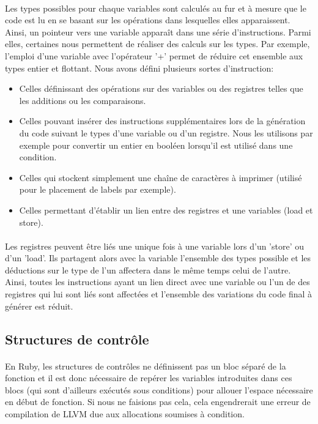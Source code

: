 \documentclass[12pt]{article}
\begin{document}
\paragraph{} Les types possibles pour chaque variables sont calculés au fur et à mesure que
le code est lu en se basant sur les opérations dans lesquelles elles
apparaissent. Ainsi, un pointeur vers une variable apparaît dans une série
d'instructions. Parmi elles, certaines nous permettent de réaliser des
calculs sur les types. Par exemple, l'emploi d'une variable avec l'opérateur
'+' permet de réduire cet ensemble aux types entier et flottant. Nous avons défini plusieurs sortes d'instruction:
\begin{itemize}
	\item Celles définissant des opérations sur des variables ou des registres
		telles que les additions ou les comparaisons.
	\item Celles pouvant insérer des instructions supplémentaires lors de la
		génération du code suivant le types d'une variable ou d'un registre.
		Nous les utilisons par exemple pour convertir un entier en booléen
		lorsqu'il est utilisé dans une condition.
	\item Celles qui stockent simplement une chaîne de caractères à imprimer
		(utilisé pour le placement de labels par exemple).
	\item Celles permettant d'établir un lien entre des registres et une
		variables (load et store).
\end{itemize}

\paragraph{} Les registres peuvent être liés une unique fois à une variable
lors d'un 'store' ou d'un 'load'. Ils partagent alors avec la variable
l'ensemble des types possible et les déductions sur le type de l'un affectera
dans le même temps celui de l'autre. Ainsi, toutes les instructions ayant un
lien direct avec une variable ou l'un de des registres qui lui sont liés sont
affectées et l'ensemble des variations du code final à générer est réduit.

\subsection{Structures de contrôle}

\paragraph{} En Ruby, les structures de contrôles ne définissent pas un bloc séparé de la fonction et il est donc nécessaire de repérer les variables introduites dans ces blocs (qui sont d'ailleurs exécutés sous conditions) pour allouer l'espace nécessaire en début de fonction. Si nous ne faisions pas cela, cela engendrerait une erreur de compilation de LLVM due aux allocations soumises à condition.
\end{document}
